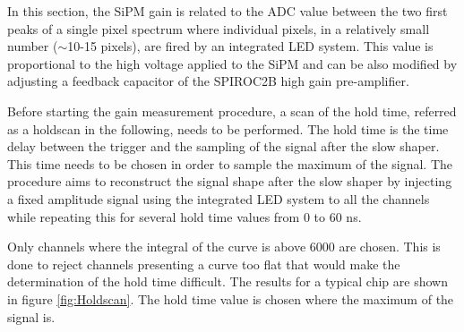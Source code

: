 In this section, the SiPM gain is related to the ADC value between the two first peaks of a single pixel spectrum where individual pixels, in a relatively small number ($\sim$10-15 pixels), are fired by an integrated LED system. This value is proportional to the high voltage applied to the SiPM and can be also modified by adjusting a feedback capacitor of the SPIROC2B high gain pre-amplifier.

Before starting the gain measurement procedure, a scan of the hold time, referred as a holdscan in the following, needs to be performed. The hold time is the time delay between the trigger and the sampling of the signal after the slow shaper. This time needs to be chosen in order to sample the maximum of the signal. The procedure aims to reconstruct the signal shape after the slow shaper by injecting a fixed amplitude signal using the integrated LED system to all the channels while repeating this for several hold time values from 0 to 60 ns.

Only channels where the integral of the curve is above 6000 are chosen. This is done to reject channels presenting a curve too flat that would make the determination of the hold time difficult. The results for a typical chip are shown in figure \ref{fig:Holdscan}. The hold time value is chosen where the maximum of the signal is.

